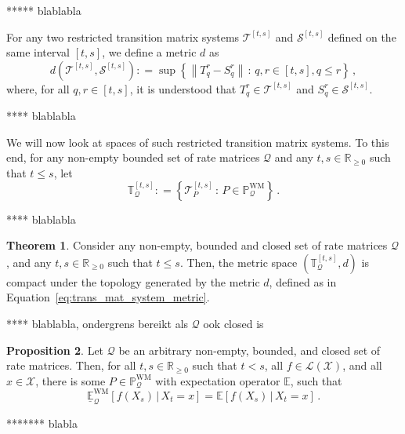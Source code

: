 \documentclass[10pt]{paper}
\theoremstyle{definition}
\newtheorem{theorem}{Theorem}
\newtheorem{proposition}[theorem]{Proposition}
\newcommand{\reals}{\mathbb{R}}
\newcommand{\realsnonneg}{\reals_{\geq 0}}
\newcommand{\states}{\mathcal{X}}
\newcommand{\processes}{\mathbb{P}}
\newcommand{\wmprocesses}{\processes^{\mathrm{WM}}}
\newcommand{\gambles}{\mathcal{L}}
\newcommand{\gamblesX}{\gambles(\states)}
\newcommand{\rateset}{\mathcal{Q}}
\newcommand{\norm}[1]{\left\lVert #1 \right\rVert}
\newcommand{\coloneqq}{:\!=}
\begin{document}
***** blablabla

For any two restricted transition matrix systems $\mathcal{T}^{[t,s]}$ and $\mathcal{S}^{[t,s]}$ defined on the same interval $[t,s]$, we define a metric $d$ as
\begin{equation}\label{eq:trans_mat_system_metric}
d(\mathcal{T}^{[t,s]},\mathcal{S}^{[t,s]}) \coloneqq \sup\left\{\norm{T_q^r - S_q^r}\,:\,q,r\in[t,s], q\leq r\right\}\,,
\end{equation}
where, for all $q,r\in[t,s]$, it is understood that $T_q^r\in\mathcal{T}^{[t,s]}$ and $S_q^r\in\mathcal{S}^{[t,s]}$.

**** blablabla

We will now look at spaces of such restricted transition matrix systems. To this end, for any non-empty bounded set of rate matrices $\rateset$ and any $t,s\in\realsnonneg$ such that $t\leq s$, let
\begin{equation*}
\mathbb{T}_\rateset^{[t,s]} \coloneqq \left\{\mathcal{T}_P^{[t,s]}\,:\,P\in\wmprocesses_\rateset\right\}\,.
\end{equation*}

**** blablabla

\begin{theorem}\label{theorem:restricted_transmatsystem_space_compact_if_Q_closed}
Consider any non-empty, bounded and closed set of rate matrices $\rateset$, and any $t,s\in\realsnonneg$ such that $t\leq s$. Then, the metric space $(\mathbb{T}_\rateset^{[t,s]},d)$ is compact under the topology generated by the metric $d$, defined as in Equation~\eqref{eq:trans_mat_system_metric}.
\end{theorem}

**** blablabla, ondergrens bereikt als $\rateset$ ook closed is

\begin{proposition}\label{prop:lower_expectation_reached_if_Q_closed}
Let $\rateset$ be an arbitrary non-empty, bounded, and closed set of rate matrices. Then, for all $t,s\in\realsnonneg$ such that $t<s$, all $f\in\gamblesX$, and all $x\in\states$, there is some $P\in\wmprocesses_\rateset$ with expectation operator $\mathbb{E}$, such that
\begin{equation*}
\underline{\mathbb{E}}^{\mathrm{WM}}_\rateset[f(X_s)\,\vert\,X_t=x] = \mathbb{E}[f(X_s)\,\vert\,X_t=x]\,.
\end{equation*}
\end{proposition}

******* blabla
\end{document}

